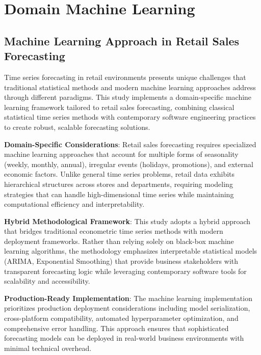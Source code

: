 %
%
%

\chapter{Domain Machine Learning}

\section{Machine Learning Approach in Retail Sales Forecasting}

Time series forecasting in retail environments presents unique challenges that traditional statistical methods and modern machine learning approaches address through different paradigms. This study implements a domain-specific machine learning framework tailored to retail sales forecasting, combining classical statistical time series methods with contemporary software engineering practices to create robust, scalable forecasting solutions.

\textbf{Domain-Specific Considerations}: Retail sales forecasting requires specialized machine learning approaches that account for multiple forms of seasonality (weekly, monthly, annual), irregular events (holidays, promotions), and external economic factors. Unlike general time series problems, retail data exhibits hierarchical structures across stores and departments, requiring modeling strategies that can handle high-dimensional time series while maintaining computational efficiency and interpretability.

\textbf{Hybrid Methodological Framework}: This study adopts a hybrid approach that bridges traditional econometric time series methods with modern deployment frameworks. Rather than relying solely on black-box machine learning algorithms, the methodology emphasizes interpretable statistical models (ARIMA, Exponential Smoothing) that provide business stakeholders with transparent forecasting logic while leveraging contemporary software tools for scalability and accessibility.

\textbf{Production-Ready Implementation}: The machine learning implementation prioritizes production deployment considerations including model serialization, cross-platform compatibility, automated hyperparameter optimization, and comprehensive error handling. This approach ensures that sophisticated forecasting models can be deployed in real-world business environments with minimal technical overhead.

